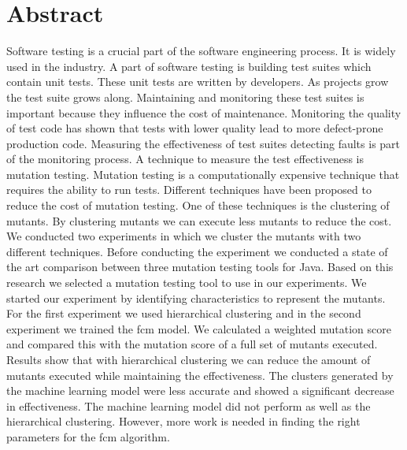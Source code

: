 \documentclass[../main]{subfiles}
\begin{document}
\chapter*{Abstract}
Software testing is a crucial part of the software engineering process. 
It is widely used in the industry.
A part of software testing is building test suites which contain unit tests.
These unit tests are written by developers. 
As projects grow the test suite grows along.
Maintaining and monitoring these test suites is important because they influence the cost of maintenance.
Monitoring the quality of test code has shown that tests with lower quality lead to more defect-prone production code.
\newline
Measuring the effectiveness of test suites detecting faults is part of the monitoring process.
A technique to measure the test effectiveness is mutation testing.
Mutation testing is a computationally expensive technique that requires the ability to run tests.
Different techniques have been proposed to reduce the cost of mutation testing.
One of these techniques is the clustering of mutants.
By clustering mutants we can execute less mutants to reduce the cost.
\newline
We conducted two experiments in which we cluster the mutants with two different techniques.
Before conducting the experiment we conducted a state of the art comparison between three mutation testing tools for Java.
Based on this research we selected a mutation testing tool to use in our experiments.
\newline
We started our experiment by identifying characteristics to represent the mutants.
For the first experiment we used hierarchical clustering and in the second experiment we trained the \acrlong{fcm} model.
We calculated a weighted mutation score and compared this with the mutation score of a full set of mutants executed.
Results show that with hierarchical clustering we can reduce the amount of mutants executed while maintaining the effectiveness.
The clusters generated by the machine learning model were less accurate and showed a significant decrease in effectiveness.
The machine learning model did not perform as well as the hierarchical clustering.
However, more work is needed in finding the right parameters for the \acrlong{fcm} algorithm. 
\end{document}
